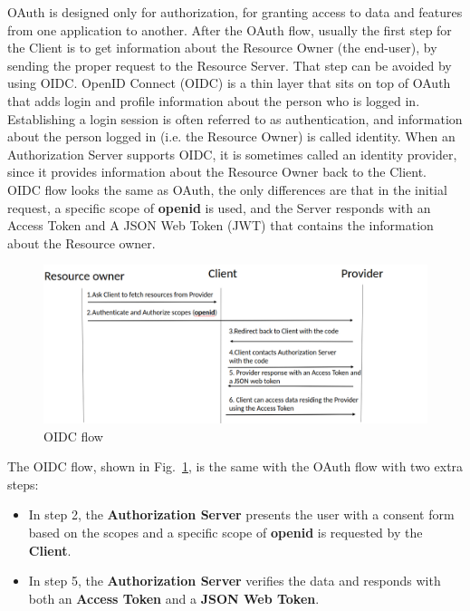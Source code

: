OAuth is designed only for authorization, for granting access to data and features from one application to another. After the OAuth flow, usually the first step for the Client is to get information about the Resource Owner (the end-user), by sending the proper request to the Resource Server. That step can be avoided by using OIDC.
OpenID Connect (OIDC) is a thin layer that sits on top of OAuth that adds login and profile information about the person who is logged in. Establishing a login session is often referred to as authentication, and information about the person logged in (i.e. the Resource Owner) is called identity. When an Authorization Server supports OIDC, it is sometimes called an identity provider, since it provides information about the Resource Owner back to the Client. OIDC flow looks the same as OAuth, the only differences are that in the initial request, a specific scope of \textbf{openid} is used, and the Server responds with an Access Token and A JSON Web Token (JWT) that contains the information about the Resource owner.

\begin{figure}[htb]
	\centering
	\includegraphics[scale=0.4]{figures/OIDC.png}
	\caption{OIDC flow}\label{oidc-flow}
\end{figure}

\pagebreak
The OIDC flow, shown in Fig.~\ref{oidc-flow}, is the same with the OAuth flow with two extra steps:

\begin{itemize}

	\item In step 2, the \textbf{Authorization Server} presents the user with a consent form based on the scopes and a specific scope of \textbf{openid} is requested by the \textbf{Client}.

	\item In step 5, the \textbf{Authorization Server} verifies the data and responds with both an \textbf{Access Token} and a \textbf{JSON Web Token}.
\end{itemize}

